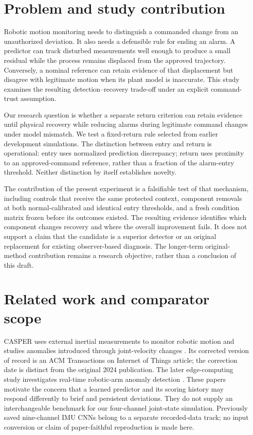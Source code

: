 \section{Problem and study contribution}
Robotic motion monitoring needs to distinguish a commanded change from an unauthorized deviation. It also needs a defensible rule for ending an alarm. A predictor can track disturbed measurements well enough to produce a small residual while the process remains displaced from the approved trajectory. Conversely, a nominal reference can retain evidence of that displacement but disagree with legitimate motion when its plant model is inaccurate. This study examines the resulting detection--recovery trade-off under an explicit command-trust assumption.

Our research question is whether a separate return criterion can retain evidence until physical recovery while reducing alarms during legitimate command changes under model mismatch. We test a fixed-return rule selected from earlier development simulations. The distinction between entry and return is operational: entry uses normalized prediction discrepancy; return uses proximity to an approved-command reference, rather than a fraction of the alarm-entry threshold. Neither distinction by itself establishes novelty.

The contribution of the present experiment is a falsifiable test of that mechanism, including controls that receive the same protected context, component removals at both normal-calibrated and identical entry thresholds, and a fresh condition matrix frozen before its outcomes existed. The resulting evidence identifies which component changes recovery and where the overall improvement fails. It does not support a claim that the candidate is a superior detector or an original replacement for existing observer-based diagnosis. The longer-term original-method contribution remains a research objective, rather than a conclusion of this draft.

\section{Related work and comparator scope}
CASPER uses external inertial measurements to monitor robotic motion and studies anomalies introduced through joint-velocity changes \cite{casper}. Its corrected version of record is an ACM Transactions on Internet of Things article; the correction date is distinct from the original 2024 publication. The later edge-computing study investigates real-time robotic-arm anomaly detection \cite{edge}. These papers motivate the concern that a learned predictor and its scoring history may respond differently to brief and persistent deviations. They do not supply an interchangeable benchmark for our four-channel joint-state simulation. Previously saved nine-channel IMU CNNs belong to a separate recorded-data track; no input conversion or claim of paper-faithful reproduction is made here.

